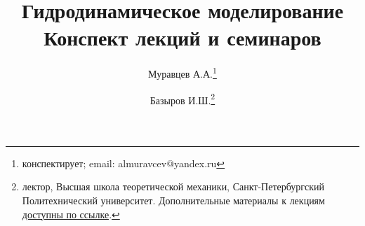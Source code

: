 \documentclass[a4paper,12pt]{article}
\begin{document}
	\tableofcontents
	\title{Гидродинамическое моделирование\\Конспект лекций и семинаров}
	\author{Муравцев А.А.\thanks{конспектирует; email: almuravcev@yandex.ru}
	\and
	Базыров И.Ш.\thanks{лектор, Высшая школа теоретической механики, Санкт-Петербургский Политехнический университет. Дополнительные материалы к лекциям \href{https://csspbstu-my.sharepoint.com/:f:/g/personal/muravtsev_aa_edu_spbstu_ru/Epiacj6WFMBHqIF6E3YQgCMB7yi5NAA1ycqFLqrTZMhJ4w?e=i2agP0}{доступны по ссылке}.}}
	\maketitle
	
	\newpage
\end{document}
